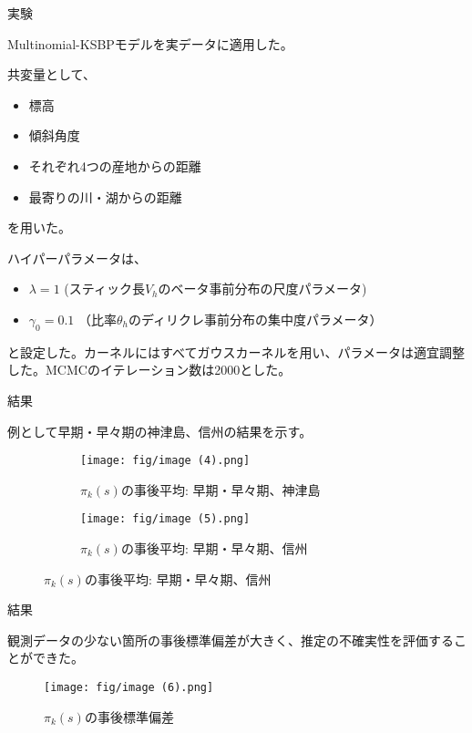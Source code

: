 \documentclass[xelatex, 8pt]{beamer}
\theoremstyle{plain}
\theoremstyle{definition}
\begin{document}
\begin{frame}{実験}

Multinomial-KSBPモデルを実データに適用した。

共変量として、

\begin{itemize}
    \item 標高
    \item 傾斜角度
    \item それぞれ4つの産地からの距離
    \item 最寄りの川・湖からの距離
\end{itemize}

を用いた。

ハイパーパラメータは、

\begin{itemize}
    \item $\lambda=1$ (スティック長$V_h$のベータ事前分布の尺度パラメータ)
    \item $\gamma_0=0.1$ （比率$\theta_h$のディリクレ事前分布の集中度パラメータ）
\end{itemize}

と設定した。カーネルにはすべてガウスカーネルを用い、パラメータは適宜調整した。MCMCのイテレーション数は2000とした。

\end{frame}

\begin{frame}{結果}

例として早期・早々期の神津島、信州の結果を示す。


\begin{figure}
    \centering
    \begin{subfigure}{0.49\textwidth}
        \centering
        \texttt{[image: fig/image (4).png]}
        \caption{$\pi_k(s)$の事後平均: 早期・早々期、神津島}
        \label{fig:pointprocess1}
    \end{subfigure}
    \hfill
    \begin{subfigure}{0.49\textwidth}
        \centering
        \texttt{[image: fig/image (5).png]}
        \caption{$\pi_k(s)$の事後平均: 早期・早々期、信州}
        \label{fig:pointprocess2}
    \end{subfigure}
    \label{fig:both-predictions}
\end{figure}

\end{frame}

\begin{frame}{結果}

観測データの少ない箇所の事後標準偏差が大きく、推定の不確実性を評価することができた。

\begin{figure}
    \centering
    \texttt{[image: fig/image (6).png]}
    \caption{$\pi_k(s)$の事後標準偏差}
    \label{fig:enter-label}
\end{figure}
\end{frame}
\end{document}
